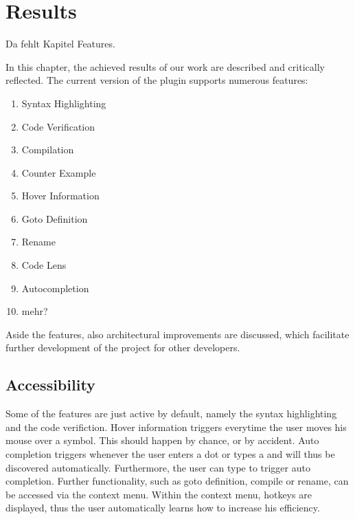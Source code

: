 \section{Results}

Da fehlt Kapitel Features.

\label{section:results}
In this chapter, the achieved results of our work are described and critically reflected.
The current version of the plugin supports numerous features:
\begin{enumerate}
    \item Syntax Highlighting
    \item Code Verification
    \item Compilation
    \item Counter Example
    \item Hover Information
    \item Goto Definition
    \item Rename
    \item Code Lens
    \item Autocompletion
    \item mehr?
\end{enumerate}


Aside the features, also architectural improvements are discussed,
which facilitate further development of the project for other developers.


\subsection{Accessibility}
Some of the features are just active by default, namely the syntax highlighting and the code verifiction.
Hover information triggers everytime the user moves his mouse over a symbol.
This should happen by chance, or by accident.
Auto completion triggers whenever the user enters a dot or types a  and will thus be discovered automatically.
Furthermore, the user can type  to trigger auto completion.
Further functionality, such as goto definition, compile or rename, can be accessed via the context menu.
Within the context menu, hotkeys are displayed, thus the user automatically learns how to increase his efficiency.

